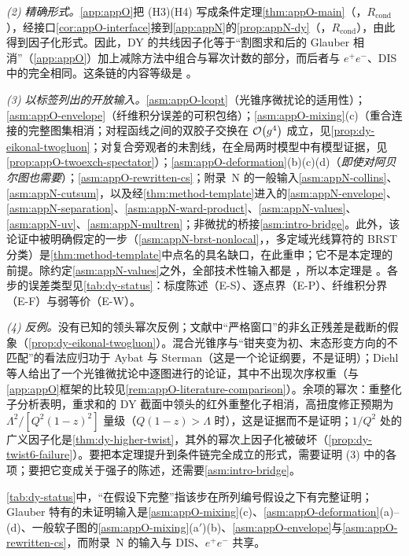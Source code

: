 \emph{(2) 精确形式。}\cref{app:appO}把 (H3)(H4) 写成条件定理\cref{thm:appO-main}（\tagR，$R_{\mathrm{cond}}$），经接口\cref{cor:appO-interface}接到\cref{app:appN}的\cref{prop:appN-dy}（\tagR，$R_{\mathrm{cond}}$），由此得到因子化形式。因此，DY 的共线因子化等于“割图求和后的 Glauber 相消”（\cref{app:appO}）加上减除方法中组合与幂次计数的部分，而后者与 $e^+e^-$、DIS 中的完全相同。这条链的内容等级是 \tagA。

\emph{(3) 以标签列出的开放输入。}\cref{asm:appO-lcopt}（光锥序微扰论的适用性）；\cref{asm:appO-envelope}（纤维积分误差的可积包络）；\cref{asm:appO-mixing}(c)（重合连接的完整图集相消；对程函线之间的双胶子交换在 $\mathcal{O}\!\left(g^4\right)$ 成立，见\cref{prop:dy-eikonal-twogluon}；对复合旁观者的未割线，在全局两时模型中有模型证据，见\cref{prop:appO-twoexch-spectator}）；\cref{asm:appO-deformation}(b)(c)(d)（\emph{即使对阿贝尔图也需要}）；\cref{asm:appO-rewritten-cs}；附录~N 的一般输入\cref{asm:appN-collins}、\cref{asm:appN-cutsum}，以及经\cref{thm:method-template}进入的\cref{asm:appN-envelope}、\cref{asm:appN-separation}、\cref{asm:appN-ward-product}、\cref{asm:appN-values}、\cref{asm:appN-uv}、\cref{asm:appN-multren}；非微扰的桥接\cref{asm:intro-bridge}。此外，该论证中被明确假定的一步（\cref{asm:appN-brst-nonlocal}，\tagC，多定域光线算符的 BRST 分类）是\cref{thm:method-template}中点名的具名缺口，在此重申；它不是本定理的前提。除约定\cref{asm:appN-values}之外，全部技术性输入都是 \tagA，所以本定理是 \tagA。各步的误差类型见\cref{tab:dy-status}：标度陈述（E-S）、逐点界（E-P）、纤维积分界（E-F）与弱等价（E-W）。

\emph{(4) 反例。}没有已知的领头幂次反例；文献中“严格窗口”的非幺正残差是截断的假象（\cref{prop:dy-eikonal-twogluon}）。混合光锥序与“钳夹变为初、末态形变方向的不匹配”的看法应归功于 Aybat 与 Sterman\cite{AybatSterman2009}（这是一个论证纲要，不是证明）；Diehl 等人给出了一个光锥微扰论中逐图进行的论证，其中不出现次序权重\cite[第~4~节]{Diehl:2015bca}（与\cref{app:appO}框架的比较见\cref{rem:appO-literature-comparison}）。余项的幂次：重整化子分析表明，重求和的 DY 截面中领头的红外重整化子相消，高扭度修正预期为 $\Lambda^2/[Q^2(1-z)^2]$ 量级（$Q(1-z)>\Lambda$ 时）\cite{BenekeBraun1995b}，这是证据而不是证明；$1/Q^2$ 处的广义因子化是\cref{thm:dy-higher-twist}，其外的幂次上因子化被破坏（\cref{prop:dy-twist6-failure}）。要把本定理提升到条件链完全成立的形式，需要证明 (3) 中的各项；要把它变成关于强子的陈述，还需要\cref{asm:intro-bridge}。



\cref{tab:dy-status}中，“在假设下完整”指该步在所列编号假设之下有完整证明；Glauber 特有的未证明输入是\cref{asm:appO-mixing}(c)、\cref{asm:appO-deformation}(a)--(d)、一般软子图的\cref{asm:appO-mixing}(a$'$)(b)、\cref{asm:appO-envelope}与\cref{asm:appO-rewritten-cs}，而附录~N 的输入与 DIS、$e^+e^-$ 共享。

